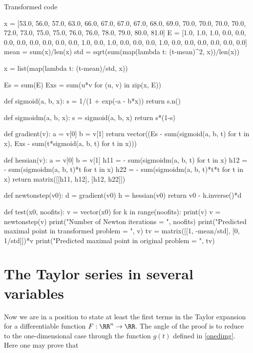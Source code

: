 \documentclass{article}
\begin{document}
\begin{hideinbutton}{Transformed code}
\begin{sage}
x = [53.0, 56.0, 57.0, 63.0, 66.0, 67.0, 67.0, 67.0, 68.0, 69.0, 70.0, 70.0, 70.0, 70.0, 72.0, 73.0, 75.0, 75.0, 76.0, 76.0, 78.0, 79.0, 80.0, 81.0]
E = [1.0, 1.0, 1.0, 0.0, 0.0, 0.0, 0.0, 0.0, 0.0, 0.0, 0.0, 1.0, 0.0, 1.0, 0.0, 0.0, 0.0, 1.0, 0.0, 0.0, 0.0, 0.0, 0.0, 0.0]
mean = sum(x)/len(x)
std = sqrt(sum(map(lambda t: (t-mean)^2, x))/len(x))

x = list(map(lambda t: (t-mean)/std, x))


Es = sum(E)
Exs = sum(u*v for (u, v) in zip(x, E))
    
def sigmoid(a, b, x):
  s = 1/(1 + exp(-a - b*x))
  return s.n()

def sigmoidm(a, b, x):
  s = sigmoid(a, b, x)
  return s*(1-s)
      
def gradient(v):
  a = v[0]
  b = v[1]
  return vector((Es - sum(sigmoid(a, b, t) for t in x), Exs - sum(t*sigmoid(a, b, t) for t in x)))
    
def hessian(v):
  a = v[0]
  b = v[1]
  h11 = - sum(sigmoidm(a, b, t) for t in x)
  h12 = - sum(sigmoidm(a, b, t)*t for t in x)
  h22 = - sum(sigmoidm(a, b, t)*t*t for t in x)
  return matrix([[h11, h12], [h12, h22]])

def newtonstep(v0):
  d = gradient(v0)
  h = hessian(v0)
  return v0 - h.inverse()*d


def test(x0, noofits):
  v = vector(x0)  
  for k in range(noofits):
    print(v)
    v = newtonstep(v)
  print("Number of Newton iterations =  ", noofits)
  print("Predicted maximal point in transformed problem =  ", v)
  tv =   matrix([[1, -mean/std], [0, 1/std]])*v
  print("Predicted maximal point in original problem =  ", tv)


  
\end{sage}
\end{hideinbutton}
\endshex

\section{The Taylor series in several variables}

Now we are in a position to state at least the first terms in the
Taylor expansion for a differentiable function $F:\RR^n\rightarrow \RR$.
The angle of the proof is to reduce to the one-dimensional case through
the function $g(t)$ defined in \eqref{onedimg}. Here
one may prove that
\end{document}
